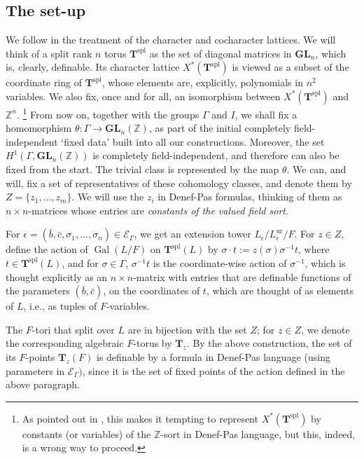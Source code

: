 \documentclass{amsart}
\newcommand{\Z}{{\mathbb Z}}
\newcommand{\GL}{\mathbf {GL}}
\newcommand{\gal}{\operatorname{Gal}}
\newcommand{\ur}{\mathrm{ur}}
\newcommand{\bT}{\mathbf {T}}
\newcommand\cE{{\mathcal E}}
\newcommand\spl{\mathrm{spl}}
\theoremstyle{plain}
\theoremstyle{definition}
\begin{document}
\subsection{The set-up}
We follow \cite{cluckers-hales-loeser} in the treatment of the character and cocharacter lattices.
We will think of a split rank $n$ torus ${\bT}^\spl$ as the set of diagonal matrices in $\GL_n$, which is, clearly, definable. Its character lattice $X^\ast({\bT}^\spl)$ is viewed as a subset of the coordinate ring of $\bT^\spl$, whose elements are, explicitly, polynomials in $n^2$ variables. 
We also fix, once and for all, an isomorphism between $X^\ast(\bT^\spl)$ and $\Z^n$. 
\footnote{As pointed out in \cite{cluckers-hales-loeser}, this makes it tempting to represent 
$X^\ast(\bT^\spl)$ by constants (or variables) of the $\Z$-sort in Denef-Pas language, but this, indeed, is a wrong way to proceed.}
From now on, together with the groups $\Gamma$ and $I$, we shall fix a homomorphism
$\theta:\Gamma \to \GL_n(\Z)$, as part of the initial completely field-independent `fixed data' built into all our constructions.
Moreover, the set $H^1(\Gamma, \GL_n(\Z))$ is completely field-independent, and therefore can also be fixed from the start. The trivial class is represented by the map $\theta$.  We can, and will, fix a set of representatives of these cohomology classes, and denote them by $Z=\{z_1, \dots, z_m\}$. We will use the $z_i$ in Denef-Pas formulas, thinking of them as $n\times n$-matrices whose entries are \emph{constants of the valued  field sort}. 
 
For $\epsilon=(\bar b, \bar c, \sigma_1, \dots, \sigma_n)\in \cE_\Gamma$, we get an extension tower 
$L_\epsilon/L_\epsilon^\ur/F$. For $z\in Z$, define the action of $\gal(L/F)$ on $\bT^\spl(L)$ by
$\sigma\cdot  t:=z(\sigma)\sigma^{-1}t$, where $t\in \bT^\spl(L)$, and for $\sigma\in \Gamma$, 
$\sigma^{-1}t$ is the coordinate-wise action of $\sigma^{-1}$, which is thought explicitly as an $n\times n$-matrix with entries that are definable functions of the parameters $(\bar b, \bar c)$, on the coordinates of $t$, which are thought of as elements of $L$, i.e., as tuples of $F$-variables. 

The $F$-tori that split over $L$ are in bijection with  the set $Z$; for $z\in Z$, we denote the corresponding algebraic $F$-torus by $\bT_z$. 
By the above construction, the set of its $F$-points $\bT_z(F)$ is definable by a formula in Denef-Pas language (using parameters in $\cE_\Gamma)$, since it is the set of fixed points of the action defined in the above paragraph. 
\end{document}
